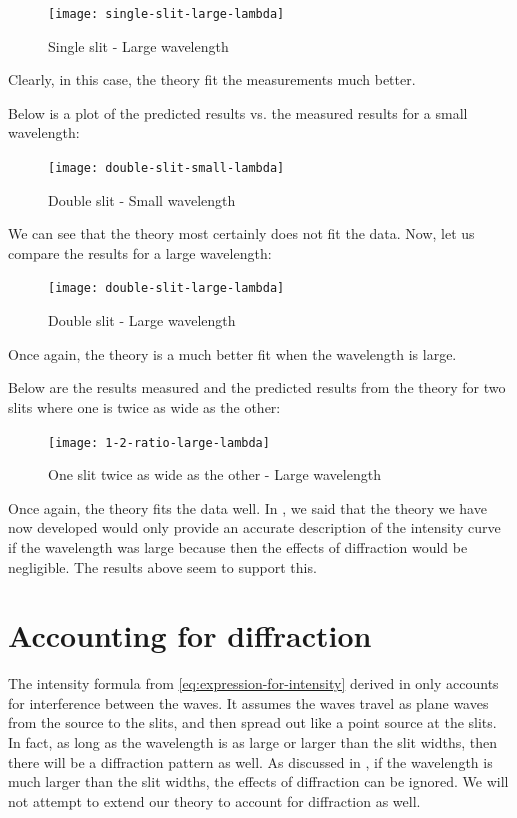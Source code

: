 \documentclass{paper}
\begin{document}
\begin{figure}[H]
\label{fig:single-slit-large-lambda}
\caption{Single slit - Large wavelength}
    \texttt{[image: single-slit-large-lambda]}
\end{figure} 

Clearly, in this case, the theory fit the measurements much better.

Below is a plot of the predicted results vs. the measured results for a small wavelength:

\begin{figure}[H]
\label{fig:double-slit-small-lambda}
\caption{Double slit - Small wavelength}
    \texttt{[image: double-slit-small-lambda]}
\end{figure}

We can see that the theory most certainly does not fit the data.
Now, let us compare the results for a large wavelength:

\begin{figure}[H]
\label{fig:double-slit-large-lambda}
\caption{Double slit - Large wavelength}
    \texttt{[image: double-slit-large-lambda]}
\end{figure}

Once again, the theory is a much better fit when the wavelength is
large.

Below are the results measured and the predicted results from the theory
for two slits where one is twice as wide as the other:

\begin{figure}[H]
\label{fig:1-2-ratio-large-lambda}
\caption{One slit twice as wide as the other - Large wavelength}
    \texttt{[image: 1-2-ratio-large-lambda]}
\end{figure}

Once again, the theory fits the data well.
In , we said that the theory we have now developed
would only provide an accurate description of the intensity curve if the wavelength was large because
then the effects of diffraction would be negligible.
The results above seem to support this.

\section{Accounting for diffraction}
\label{section:accounting-for-diffraction}

The intensity formula from \eqref{eq:expression-for-intensity} derived in  only accounts for interference between the waves. It assumes the waves travel as plane waves from the source to the slits, and then spread out like a point source at the slits. In fact, as long as the wavelength is as large or larger than the slit widths, then there will be a diffraction pattern as well. As discussed in , if the wavelength is much larger than the slit widths, the effects of diffraction can be ignored. We will not attempt to extend our theory to account for diffraction as well.
\end{document}

